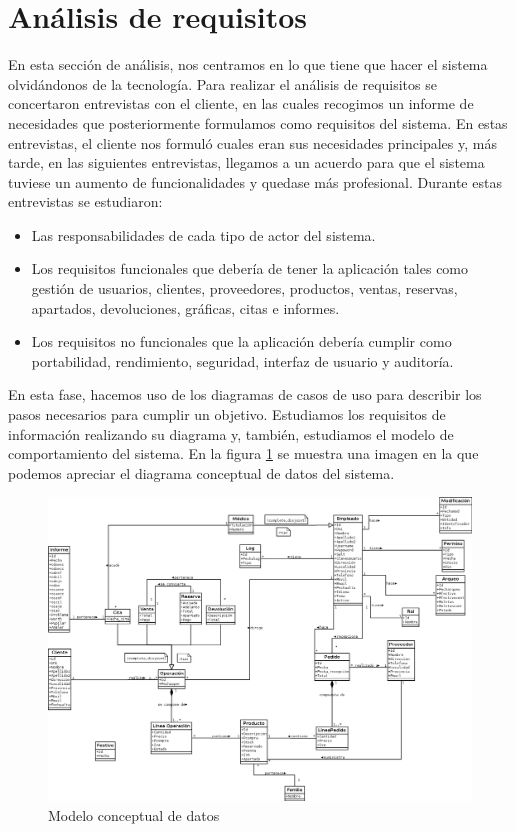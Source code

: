 \documentclass[a4paper,12pt]{article}
\begin{document}
\newpage
\section{\fontsize{12}{1}\selectfont Análisis de requisitos}
\noindent En esta sección de análisis, nos centramos en lo que tiene que hacer el sistema olvidándonos de la tecnología. Para realizar el análisis de requisitos se concertaron entrevistas con el cliente, en las cuales recogimos un informe de necesidades que posteriormente formulamos como requisitos del sistema. En estas entrevistas, el cliente nos formuló cuales eran sus necesidades principales y, más tarde, en las siguientes entrevistas, llegamos a un acuerdo para que el sistema tuviese un aumento de funcionalidades y quedase más profesional. Durante estas entrevistas se estudiaron:
\renewcommand{\labelitemi}{$\diamond$}
\begin{itemize}
\item Las responsabilidades de cada tipo de actor del sistema.
\item Los requisitos funcionales que debería de tener la aplicación tales como gestión de usuarios, clientes, proveedores, productos, ventas, reservas, apartados, devoluciones, gráficas, citas e informes.
\item Los requisitos no funcionales que la aplicación debería cumplir como portabilidad, rendimiento, seguridad, interfaz de usuario y auditoría.
\end{itemize}
 En esta fase, hacemos uso de los diagramas de casos de uso para describir los pasos necesarios para cumplir un objetivo. Estudiamos los requisitos de información realizando su diagrama y, también, estudiamos el modelo de comportamiento del sistema. En la figura \ref{uml} se muestra una imagen en la que podemos apreciar el diagrama conceptual de datos del sistema.

\newpage

\begin{figure}[!ht]
  \centering
    \includegraphics[angle=270,scale=0.33]{UML}
  \caption{Modelo conceptual de datos}
\label{uml}
\end{figure}
\end{document}
